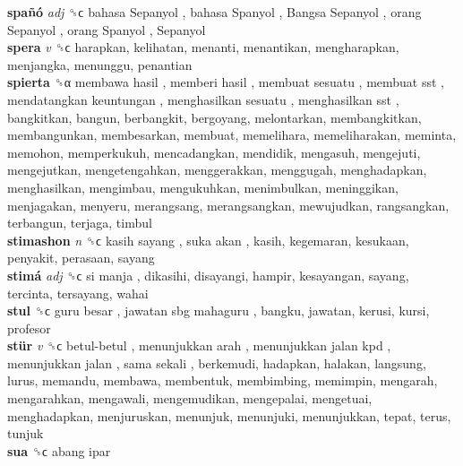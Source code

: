 \textbf{spañó} \emph{adj}  ␝ϲ   bahasa Sepanyol ,  bahasa Spanyol ,  Bangsa Sepanyol ,  orang Sepanyol ,  orang Spanyol ,  Sepanyol   \\
\textbf{spera} \emph{v}  ␝ϲ  harapkan, kelihatan, menanti, menantikan, mengharapkan, menjangka, menunggu, penantian  \\
\textbf{spierta} ␝α   membawa hasil ,  memberi hasil ,  membuat sesuatu ,  membuat sst ,  mendatangkan keuntungan ,  menghasilkan sesuatu ,  menghasilkan sst , bangkitkan, bangun, berbangkit, bergoyang, melontarkan, membangkitkan, membangunkan, membesarkan, membuat, memelihara, memeliharakan, meminta, memohon, memperkukuh, mencadangkan, mendidik, mengasuh, mengejuti, mengejutkan, mengetengahkan, menggerakkan, menggugah, menghadapkan, menghasilkan, mengimbau, mengukuhkan, menimbulkan, meninggikan, menjagakan, menyeru, merangsang, merangsangkan, mewujudkan, rangsangkan, terbangun, terjaga, timbul  \\
\textbf{stimashon} \emph{n}  ␝ϲ   kasih sayang ,  suka akan , kasih, kegemaran, kesukaan, penyakit, perasaan, sayang  \\
\textbf{stimá} \emph{adj}  ␝ϲ   si manja , dikasihi, disayangi, hampir, kesayangan, sayang, tercinta, tersayang, wahai  \\
\textbf{stul} ␝ϲ   guru besar ,  jawatan sbg mahaguru , bangku, jawatan, kerusi, kursi, profesor  \\
\textbf{stür} \emph{v}  ␝ϲ   betul-betul ,  menunjukkan arah ,  menunjukkan jalan kpd ,  menunjukkan jalan ,  sama sekali , berkemudi, hadapkan, halakan, langsung, lurus, memandu, membawa, membentuk, membimbing, memimpin, mengarah, mengarahkan, mengawali, mengemudikan, mengepalai, mengetuai, menghadapkan, menjuruskan, menunjuk, menunjuki, menunjukkan, tepat, terus, tunjuk  \\
\textbf{sua} ␝ϲ   abang ipar   \\
